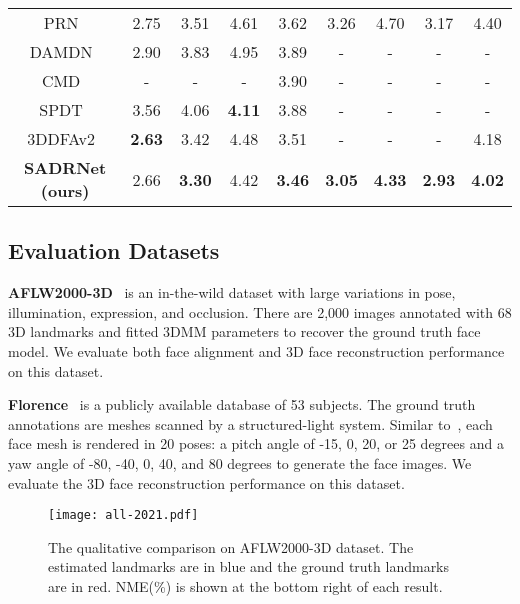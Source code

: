 \documentclass[journal]{IEEEtran}
\begin{document}
\begin{table*}[tbp]
\begin{center}
\begin{tabular}{|c|c|c|c|c|c|c|c|c|}
				PRN~\cite{PRN}           &    2.75    &    3.51    &    4.61    &    3.62    &    3.26    &    4.70    &    3.17    &        4.40        \\
				DAMDN~\cite{dual_attention}    &    2.90    &    3.83    &    4.95    &    3.89    &     -      &     -      &     -      &         -          \\
				CMD~\cite{FPS}           &     -      &     -      &     -      &    3.90    &     -      &     -      &     -      &         -          \\
				SPDT~\cite{semi_2019_ICCV}     &    3.56    &    4.06    & {\bf 4.11} &    3.88    &     -      &     -      &     -      &         -          \\
				3DDFAv2~\cite{3ddfav2}      &   \bf{2.63}    &    3.42    &    4.48    &    3.51    &     -      &     -      &     -      &         4.18          \\
				{\bf SADRNet (ours)}         & 2.66 & {\bf 3.30} &    4.42    &    {\bf 3.46}    & {\bf 3.05} & {\bf 4.33} &    {\bf 2.93}    &        {\bf4.02}        \\
				\hline
			\end{tabular}
			
		\end{center}
		\label{tab:sparse alignment}
	\end{table*}
	
	\subsection{Evaluation Datasets}
	{\bf AFLW2000-3D}~\cite{3DDFA} is an in-the-wild dataset with large variations in pose, illumination, expression, and occlusion. There are 2,000 images annotated with 68 3D landmarks and fitted 3DMM parameters to recover the ground truth face model. We evaluate both face alignment and 3D face reconstruction performance on this dataset.
	
	{\bf Florence}~\cite{florence} is a publicly available database of 53 subjects. The ground truth annotations are meshes scanned by a structured-light system. Similar to~\cite{VRN,PRN,MMFace2019_CVPR}, each face mesh is rendered in 20 poses: a pitch angle of -15, 0, 20, or 25 degrees and a yaw angle of -80, -40, 0, 40, and 80 degrees to generate the face images. We evaluate the 3D face reconstruction performance on this dataset.
	
	\begin{figure*}[tbp]
		
		\begin{center}
			
			\texttt{[image: all-2021.pdf]}
		\end{center}
		
		\caption{The qualitative comparison on AFLW2000-3D dataset. The estimated landmarks are in blue and the ground truth landmarks are in red. NME(\%) is shown at the bottom right of each result.}
		\label{fig:all}
	\end{figure*}
	
\end{document}
